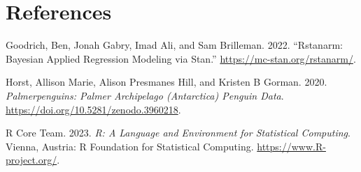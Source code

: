 \documentclass[
  letterpaper,
  DIV=11,
  numbers=noendperiod]{scrartcl}
\newlength{\cslhangindent}
\newenvironment{CSLReferences}[2] %
 {\begin{list}{}{%
  \setlength{\itemindent}{0pt}
  \setlength{\leftmargin}{0pt}
  \setlength{\parsep}{0pt}
  \ifodd #1
   \setlength{\leftmargin}{\cslhangindent}
   \setlength{\itemindent}{-1\cslhangindent}
  \fi
  \setlength{\itemsep}{#2\baselineskip}}}
 {\end{list}}
\begin{document}
\newpage

\section*{References}\label{references}

\label{refs}
\begin{CSLReferences}{1}{0}
Goodrich, Ben, Jonah Gabry, Imad Ali, and Sam Brilleman. 2022.
{``Rstanarm: {Bayesian} Applied Regression Modeling via {Stan}.''}
\url{https://mc-stan.org/rstanarm/}.

Horst, Allison Marie, Alison Presmanes Hill, and Kristen B Gorman. 2020.
\emph{Palmerpenguins: Palmer Archipelago (Antarctica) Penguin Data}.
\url{https://doi.org/10.5281/zenodo.3960218}.

R Core Team. 2023. \emph{R: A Language and Environment for Statistical
Computing}. Vienna, Austria: R Foundation for Statistical Computing.
\url{https://www.R-project.org/}.

\end{CSLReferences}
\end{document}

